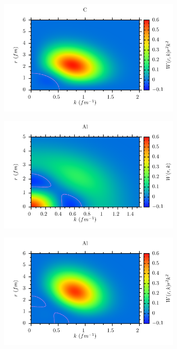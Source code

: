 \documentclass[11pt,twoside]{book}
\begin{document}
\begin{figure}
\begin{subfigure}[b]{0.49\textwidth}
 \end{subfigure}
 \begin{subfigure}[b]{0.49\textwidth} 
 	\includegraphics[width=\textwidth]{./figuren/Cprob.pdf}  
 \end{subfigure} 
 \begin{subfigure}[b]{0.49\textwidth} 
 	\includegraphics[width=\textwidth]{./figuren/Al.pdf}  
 \end{subfigure} 
 \begin{subfigure}[b]{0.49\textwidth} 
 	\includegraphics[width=\textwidth]{./figuren/Alprob.pdf}  

\end{subfigure}
\end{figure}
\end{document}
